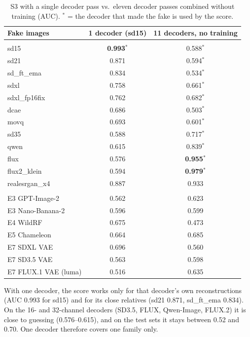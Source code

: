 \begin{table}[H]
\centering
\small
\caption{S3 with a single decoder pass vs.\ eleven decoder passes combined without training (AUC). $^{*}$ = the decoder that made the fake is used by the score.}
\label{tab:s3naive}
\begin{tabular}{>{\raggedright\arraybackslash}p{5.2cm} c c}
\toprule
\textbf{Fake images} & \textbf{1 decoder (sd15)} & \textbf{11 decoders, no training} \\
\midrule
\multicolumn{3}{l}{\textit{Validation: reconstructions by each decoder}} \\
sd15 & \textbf{0.993}$^{*}$ & 0.588$^{*}$ \\
sd21 & 0.871 & 0.594$^{*}$ \\
sd\_ft\_ema & 0.834 & 0.534$^{*}$ \\
sdxl & 0.758 & 0.661$^{*}$ \\
sdxl\_fp16fix & 0.762 & 0.682$^{*}$ \\
dcae & 0.686 & 0.503$^{*}$ \\
movq & 0.693 & 0.601$^{*}$ \\
sd35 & 0.588 & 0.717$^{*}$ \\
qwen & 0.615 & 0.839$^{*}$ \\
flux & 0.576 & \textbf{0.955}$^{*}$ \\
flux2\_klein & 0.594 & \textbf{0.979}$^{*}$ \\
realesrgan\_x4 & 0.887 & 0.933 \\
\midrule
\multicolumn{3}{l}{\textit{Test sets}} \\
E3 GPT-Image-2 & 0.562 & 0.623 \\
E3 Nano-Banana-2 & 0.596 & 0.599 \\
E4 WildRF & 0.675 & 0.473 \\
E5 Chameleon & 0.664 & 0.685 \\
E7 SDXL VAE & 0.696 & 0.560 \\
E7 SD3.5 VAE & 0.563 & 0.598 \\
E7 FLUX.1 VAE (luma) & 0.516 & 0.635 \\
\bottomrule
\end{tabular}
\end{table}

With one decoder, the score works only for that decoder's own reconstructions (AUC 0.993 for sd15) and for its close relatives (sd21 0.871, sd\_ft\_ema 0.834). On the 16- and 32-channel decoders (SD3.5, FLUX, Qwen-Image, FLUX.2) it is close to guessing (0.576--0.615), and on the test sets it stays between 0.52 and 0.70. One decoder therefore covers one family only.


